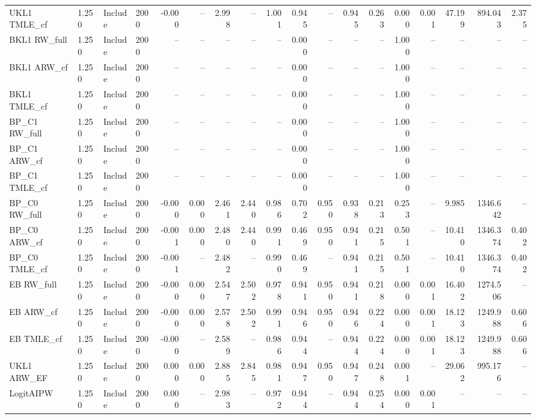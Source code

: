 \begin{tabular}{llllrrrrrrrrrrrrrr}
UKL1 TMLE\_cf & 1.250 & Include & 2000 & -0.000 & -- & 2.998 & -- & 1.001 & 0.945 & -- & 0.945 & 0.263 & 0.000 & 0.001 & 47.199 & 894.043 & 2.375 \\
BKL1 RW\_full & 1.250 & Include & 2000 & -- & -- & -- & -- & -- & 0.000 & -- & -- & -- & 1.000 & -- & -- & -- & -- \\
BKL1 ARW\_cf & 1.250 & Include & 2000 & -- & -- & -- & -- & -- & 0.000 & -- & -- & -- & 1.000 & -- & -- & -- & -- \\
BKL1 TMLE\_cf & 1.250 & Include & 2000 & -- & -- & -- & -- & -- & 0.000 & -- & -- & -- & 1.000 & -- & -- & -- & -- \\
BP\_C1 RW\_full & 1.250 & Include & 2000 & -- & -- & -- & -- & -- & 0.000 & -- & -- & -- & 1.000 & -- & -- & -- & -- \\
BP\_C1 ARW\_cf & 1.250 & Include & 2000 & -- & -- & -- & -- & -- & 0.000 & -- & -- & -- & 1.000 & -- & -- & -- & -- \\
BP\_C1 TMLE\_cf & 1.250 & Include & 2000 & -- & -- & -- & -- & -- & 0.000 & -- & -- & -- & 1.000 & -- & -- & -- & -- \\
BP\_C0 RW\_full & 1.250 & Include & 2000 & -0.000 & 0.000 & 2.461 & 2.440 & 0.986 & 0.702 & 0.950 & 0.938 & 0.213 & 0.253 & -- & 9.985 & 1346.642 & -- \\
BP\_C0 ARW\_cf & 1.250 & Include & 2000 & -0.001 & 0.000 & 2.480 & 2.440 & 0.991 & 0.469 & 0.950 & 0.941 & 0.215 & 0.501 & -- & 10.410 & 1346.374 & 0.402 \\
BP\_C0 TMLE\_cf & 1.250 & Include & 2000 & -0.001 & -- & 2.482 & -- & 0.990 & 0.469 & -- & 0.941 & 0.215 & 0.501 & -- & 10.410 & 1346.374 & 0.402 \\
EB RW\_full & 1.250 & Include & 2000 & -0.000 & 0.000 & 2.547 & 2.502 & 0.978 & 0.941 & 0.950 & 0.941 & 0.218 & 0.000 & 0.001 & 16.402 & 1274.506 & -- \\
EB ARW\_cf & 1.250 & Include & 2000 & -0.000 & 0.000 & 2.578 & 2.502 & 0.991 & 0.946 & 0.950 & 0.946 & 0.224 & 0.000 & 0.001 & 18.123 & 1249.988 & 0.606 \\
EB TMLE\_cf & 1.250 & Include & 2000 & -0.000 & -- & 2.589 & -- & 0.986 & 0.944 & -- & 0.944 & 0.224 & 0.000 & 0.001 & 18.123 & 1249.988 & 0.606 \\
UKL1 ARW\_EF & 1.250 & Include & 2000 & 0.000 & 0.000 & 2.885 & 2.845 & 0.981 & 0.947 & 0.950 & 0.947 & 0.248 & 0.001 & -- & 29.062 & 995.176 & -- \\
LogitAIPW & 1.250 & Include & 2000 & 0.000 & -- & 2.983 & -- & 0.972 & 0.944 & -- & 0.944 & 0.254 & 0.000 & 0.001 & -- & -- & -- \\

\end{tabular}
